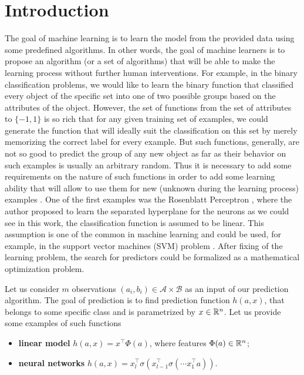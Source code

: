 \section{Introduction}\label{sec:basics_intro}
The goal of machine learning is to learn the model from the provided data using some predefined algorithms. In other words, the goal of machine learners is to propose an algorithm (or a set of algorithms) that will be able to make the learning process without further human interventions. For example, in the binary classification problems, we would like to learn the binary function that classified every object of the specific set into one of two possible groups based on the attributes of the object. However, the set of functions from the set of attributes to $\{-1,1\}$ is so rich that for any given training set of examples, we could generate the function that will ideally suit the classification on this set by merely memorizing the correct label for every example. But such functions, generally, are not so good to predict the group of any new object as far as their behavior on such examples is usually an arbitrary random. Thus it is necessary to add some requirements on the nature of such functions in order to add some learning ability that will allow to use them for new (unknown during the learning process) examples \cite{vapnik2013nature}. One of the first examples was the Rosenblatt Perceptron \cite{rosenblatt1960perceptron}, where the author proposed to learn the separated hyperplane for the neurons as we could see in this work, the classification function is assumed to be linear. This assumption is one of the common in machine learning and could be used, for example, in the support vector machines (SVM) problem \cite{suykens1999least}. After fixing of the learning problem, the search for predictors could be formalized as a mathematical optimization problem.


Let us consider $m$ observations $(a_i, b_i)\in\mathcal{A}\times\mathcal{B}$ as an input of our prediction algorithm. The goal of prediction is to find prediction function $h(a, x)$, that belongs to some specific class and is parametrized by $x\in\mathbb{R}^n$. Let us provide some examples of such functions
\begin{itemize}
    \item[] {\textbf{linear model}} $h(a,x) = x^\top \Phi(a)$, where features $\Phi(a)\in\mathbb{R}^n$;
    \item[] {\textbf{neural networks}} $h(a,x) = x_l^\top\sigma(x_{l-1}^\top\sigma(\cdots x_1^\top a))$.
\end{itemize}

